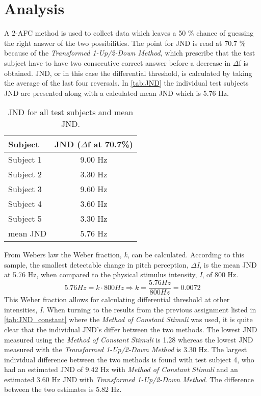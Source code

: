 \section*{Analysis}
\label{analysis}
%
A 2-AFC method is used to collect data which leaves a 50 \% chance of guessing the right answer of the two possibilities. The point for JND is read at 70.7 \% because of the \textit{Transformed 1-Up/2-Down Method}, which prescribe that the test subject have to have two consecutive correct answer before a decrease in $\Delta$f is obtained.\blankline
%
JND, or in this case the differential threshold, is calculated by taking the average of the last four reversals. In \autoref{tab:JND} the individual test subjects JND are presented along with a calculated mean JND which is 5.76 Hz. 
%
\begin{table}[H]
	\centering
	\begin{tabular}{l|c}
		Subject     & JND ($\Delta$f at 70.7\%) \\\hline
		Subject 1   & 9.00 Hz          \\\hline
		Subject 2   & 3.30 Hz            \\\hline
		Subject 3   & 9.60 Hz              \\\hline
		Subject 4   & 3.60 Hz            \\\hline
		Subject 5   & 3.30 Hz               \\\hline
		mean JND &    5.76 Hz   
	\end{tabular}
	\caption{JND for all test subjects and mean JND.}
	\label{tab:JND}         
\end{table}
\noindent
%
From Webers law the Weber fraction, \textit{k}, can be calculated. According to this sample, the smallest detectable change in pitch perception, \textit{$\Delta$I}, is the mean JND at 5.76 Hz, when compared to the physical stimulus intensity, \textit{I}, of 800 Hz.
% 
\begin{equation}
5.76 Hz = k \cdot 800 Hz \Rightarrow k = \frac{5.76 Hz}{800 Hz} = 0.0072
\end{equation}
%
This Weber fraction allows for calculating differential threshold at other intensities, \textit{I}.\blankline 
%
When turning to the results from the previous assignment listed in \autoref{tab:JND_constant} where the \textit{Method of Constant Stimuli} was used, it is quite clear that the individual JND's differ between the two methods. The lowest JND measured using the \textit{Method of Constant Stimuli} is 1.28 whereas the lowest JND measured with the \textit{Transformed 1-Up/2-Down Method} is 3.30 Hz. The largest individual difference between the two methods is found with test subject 4, who had an estimated JND of 9.42 Hz with \textit{Method of Constant Stimuli} and an estimated 3.60 Hz JND with \textit{Transformed 1-Up/2-Down Method}. The difference between the two estimates is 5.82 Hz.   
